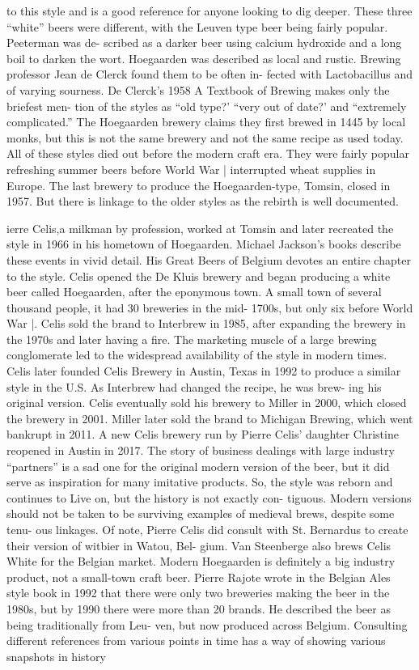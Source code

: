 \documentclass[a4paper,parskip=half]{scrartcl}
\begin{document}
to this style and is a good reference for
anyone looking to dig deeper.
These three “white” beers were
different, with the Leuven type beer
being fairly popular. Peeterman was de-
scribed as a darker beer using calcium
hydroxide and a long boil to darken
the wort. Hoegaarden was described as
local and rustic. Brewing professor Jean
de Clerck found them to be often in-
fected with Lactobacillus and of varying
sourness. De Clerck’s 1958 A Textbook of
Brewing makes only the briefest men-
tion of the styles as “old type?’ “very out
of date?’ and “extremely complicated.”
The Hoegaarden brewery claims they
first brewed in 1445 by local monks,
but this is not the same brewery and
not the same recipe as used today.
All of these styles died out before
the modern craft era. They were fairly
popular refreshing summer beers before
World War | interrupted wheat supplies
in Europe. The last brewery to produce
the Hoegaarden-type, Tomsin, closed in
1957. But there is linkage to the older
styles as the rebirth is well documented.

\parencite[25]{Strong2021}
ierre Celis,a milkman by profession,
worked at Tomsin and later recreated
the style in 1966 in his hometown of
Hoegaarden. Michael Jackson's books
describe these events in vivid detail. His
Great Beers of Belgium devotes an entire
chapter to the style.
Celis opened the De Kluis brewery
and began producing a white beer
called Hoegaarden, after the eponymous
town. A small town of several thousand
people, it had 30 breweries in the mid-
1700s, but only six before World War
|. Celis sold the brand to Interbrew in
1985, after expanding the brewery in
the 1970s and later having a fire. The
marketing muscle of a large brewing
conglomerate led to the widespread
availability of the style in modern times.
Celis later founded Celis Brewery
in Austin, Texas in 1992 to produce a
similar style in the U.S. As Interbrew
had changed the recipe, he was brew-
ing his original version. Celis eventually
sold his brewery to Miller in 2000,
which closed the brewery in 2001.
Miller later sold the brand to Michigan
Brewing, which went bankrupt in 2011.
A new Celis brewery run by Pierre Celis’
daughter Christine reopened in Austin
in 2017.
The story of business dealings with
large industry “partners” is a sad one
for the original modern version of the
beer, but it did serve as inspiration
for many imitative products. So, the
style was reborn and continues to Live
on, but the history is not exactly con-
tiguous. Modern versions should not
be taken to be surviving examples of
medieval brews, despite some tenu-
ous linkages. Of note, Pierre Celis did
consult with St. Bernardus to create
their version of witbier in Watou, Bel-
gium. Van Steenberge also brews Celis
White for the Belgian market. Modern
Hoegaarden is definitely a big industry
product, not a small-town craft beer.
Pierre Rajote wrote in the Belgian
Ales style book in 1992 that there were
only two breweries making the beer
in the 1980s, but by 1990 there were
more than 20 brands. He described the
beer as being traditionally from Leu-
ven, but now produced across Belgium.
Consulting different references from
various points in time has a way of
showing various snapshots in history
\end{document}

